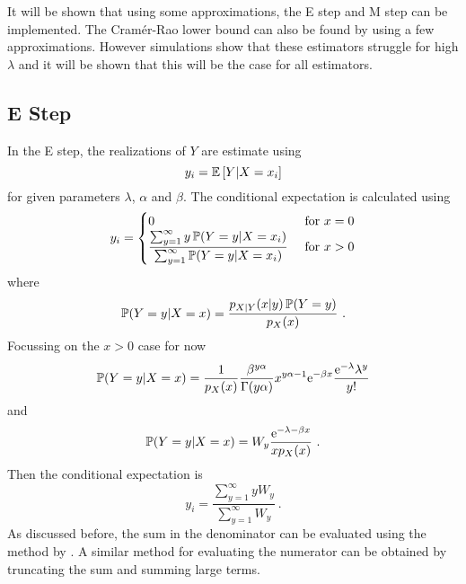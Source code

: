 It will be shown that using some approximations, the E step and M step can be implemented. The Cram\'er-Rao lower bound \citep{rao1945information, cramer1946mathematical} can also be found by using a few approximations. However simulations show that these estimators struggle for high $\lambda$ and it will be shown that this will be the case for all estimators.

\subsection{E Step}

In the E step, the realizations of $Y$ are estimate using
\begin{equation}
  y_i =
  \operatorname{\mathbb{E}}\left[
    Y|X=x_i
  \right]
\end{equation}
for given parameters $\lambda$, $\alpha$ and $\beta$. The conditional expectation is calculated using
\begin{equation}
  y_i = 
  \begin{cases}
    0 & \text{ for } x=0 \\ 
    \dfrac{\sum_{y=1}^\infty y \operatorname{\mathbb{P}}(Y=y|X=x_i)}{\sum_{y=1}^\infty \operatorname{\mathbb{P}}(Y=y|X=x_i)} & \text{ for } x>0
  \end{cases}
\end{equation}
where
\begin{equation*}
  \operatorname{\mathbb{P}}(Y=y|X=x) = \frac{p_{X|Y}(x|y)\operatorname{\mathbb{P}}(Y=y)}{p_X(x)}
  \ .
\end{equation*}
Focussing on the $x>0$ case for now
\begin{equation*}
  \operatorname{\mathbb{P}}(Y=y|X=x) = \frac{1}{p_X(x)}\frac{\beta^{y\alpha}}{\Gamma(y\alpha)}x^{y\alpha-1}\mathrm{e}^{-\beta x}\frac{\mathrm{e}^{-\lambda}\lambda^y}{y!}
\end{equation*}
and
\begin{equation}
  \operatorname{\mathbb{P}}(Y=y|X=x) = W_y \frac{\mathrm{e}^{-\lambda-\beta x}}{x p_X(x)} \ .
\end{equation}
Then the conditional expectation is
\begin{equation}
  y_i = \frac{\sum_{y=1}^\infty y W_y}{\sum_{y=1}^\infty W_y}
  \ .
\end{equation}
As discussed before, the sum in the denominator can be evaluated using the method by \cite{dunn2005series}. A similar method for evaluating the numerator can be obtained by truncating the sum and summing large terms.

